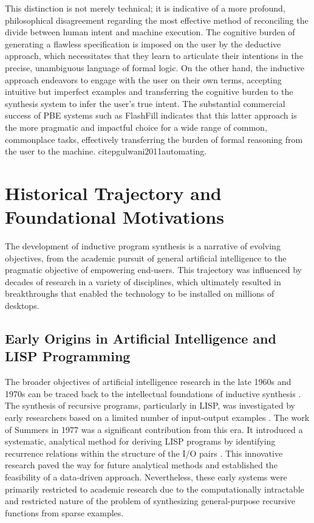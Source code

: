 \documentclass[12pt, a4paper]{report}
\begin{document}
This distinction is not merely technical; it is indicative of a more profound, philosophical disagreement regarding the most effective method of reconciling the divide between human intent and machine execution.  The cognitive burden of generating a flawless specification is imposed on the user by the deductive approach, which necessitates that they learn to articulate their intentions in the precise, unambiguous language of formal logic.  On the other hand, the inductive approach endeavors to engage with the user on their own terms, accepting intuitive but imperfect examples and transferring the cognitive burden to the synthesis system to infer the user's true intent.  The substantial commercial success of PBE systems such as FlashFill indicates that this latter approach is the more pragmatic and impactful choice for a wide range of common, commonplace tasks, effectively transferring the burden of formal reasoning from the user to the machine. citep{gulwani2011automating}.

\section{Historical Trajectory and Foundational Motivations}

The development of inductive program synthesis is a narrative of evolving objectives, from the academic pursuit of general artificial intelligence to the pragmatic objective of empowering end-users.  This trajectory was influenced by decades of research in a variety of disciplines, which ultimately resulted in breakthroughs that enabled the technology to be installed on millions of desktops.

\subsection{Early Origins in Artificial Intelligence and LISP Programming}

The broader objectives of artificial intelligence research in the late 1960s and 1970s can be traced back to the intellectual foundations of inductive synthesis \citep{gulwani2017program}.  The synthesis of recursive programs, particularly in LISP, was investigated by early researchers based on a limited number of input-output examples \citep{summers1977methodology}.  The work of Summers in 1977 was a significant contribution from this era. It introduced a systematic, analytical method for deriving LISP programs by identifying recurrence relations within the structure of the I/O pairs \citep{summers1977methodology}.  This innovative research paved the way for future analytical methods and established the feasibility of a data-driven approach.  Nevertheless, these early systems were primarily restricted to academic research due to the computationally intractable and restricted nature of the problem of synthesizing general-purpose recursive functions from sparse examples.
\end{document}
